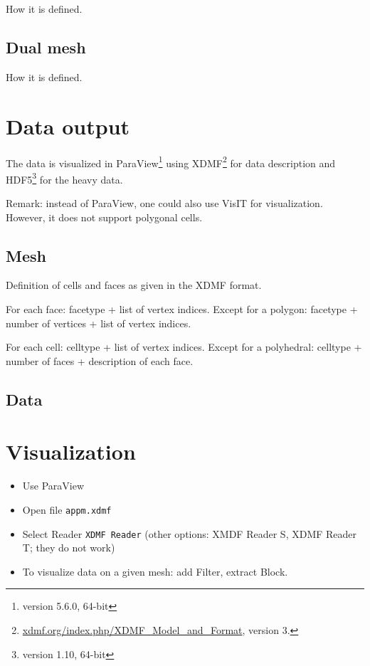 \documentclass{article}
\begin{document}
How it is defined.



\subsection{Dual mesh}

How it is defined.



\section{Data output}

The data is visualized in ParaView\footnote{version 5.6.0, 64-bit} 
using XDMF\footnote{\url{xdmf.org/index.php/XDMF_Model_and_Format}, version 3.} 
for data description and HDF5\footnote{version 1.10, 64-bit} 
for the heavy data.

Remark: instead of ParaView, one could also use VisIT for visualization. However, it does not support polygonal cells. 






\subsection{Mesh}

Definition of cells and faces as given in the XDMF format. 

For each face: facetype + list of vertex indices. Except for a polygon: facetype + number of vertices + list of vertex indices.

For each cell: celltype + list of vertex indices. Except for a polyhedral: celltype + number of faces + description of each face.




\subsection{Data}


\section{Visualization}

\begin{itemize}
\item Use ParaView
\item Open file \texttt{appm.xdmf}
\item Select Reader \texttt{XDMF Reader} (other options: XMDF Reader S, XDMF Reader T; they do not work)

\item To visualize data on a given mesh: add Filter, extract Block.
\end{itemize}
\end{document}
